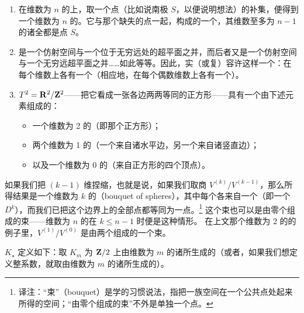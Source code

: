 \begin{example}\label{thm:cellular-decomposition-examples}
\begin{enumerate}[label=(\arabic*)]
\item 在维数为 $n$ 的\trSphere{}上，取一个点（比如说南极 $S$，以便说明想法）的补集，便得到一个维数为 $n$ 的\trOpen{}\trDisk{}。它与那个缺失的点一起，构成\trSphere{}的一个\trCellularDecomposition，其维数至多为 $n-1$ 的诸\trSkeleton{}全都是点 $S$。
\item \trProjectiveSpace{}是一个仿射空间与一个位于无穷远处的超平面之并，而后者又是一个仿射空间与一个无穷远超平面之并……如此等等。因此，实（或复）\trProjectiveSpace{}容许这样一个\trCellularDecomposition：在每个维数上各有一个\trCellular（相应地，在每个偶数维数上各有一个）。
\item \trTorus{} $T^2=\mathbf{R}^2/\mathbf{Z}^2$——把它看成一张各边两两等同的正方形——具有一个由下述元素组成的\trCellularDecomposition：
  \begin{itemize}
  \item 一个维数为 2 的\trCellular（即那个\trOpen{}正方形）；
  \item 两个维数为 1 的\trCellular（一个来自诸水平边，另一个来自诸竖直边）；
  \item 以及一个维数为 0 的\trCellular（来自正方形的四个顶点）。
  \end{itemize}
\end{enumerate}
\end{example}

\begin{remark}\label{thm:skeleton-quotient-bouquet}
如果我们把 $(k-1)$ 维\trSkeleton{}捏缩，也就是说，如果我们取商 $V^{(k)}/V^{(k-1)}$，那么所得结果是一个维数为 $k$ 的\textbf{\trBouquetOfSpheres}（bouquet of spheres），其中每个\trSphere{}各来自一个\trCellular（即一个 $D^k$），而我们已把这个\trCellular{}边界上的全部点都等同为一点。\footnote{译注：“束”（bouquet）是\trTopology{}学的习惯说法，指把一族空间在一个公共点处\trGluing{}起来所得的空间；“由零个\trSphere{}组成的束”不外是单独一个点。}
这个束也可以是由零个\trSphere{}组成的束——维数为 $n$ 的\trSphere{}在 $k\le n-1$ 时便是这种情形。
在上文那个维数为 2 的\trTorus{}的例子里，$V^{(1)}/V^{(0)}$ 是由两个\trCircle{}组成的一个束。
\end{remark}

\trCellular\trComplex{} $K_\star$ 定义如下：取 $K_m$ 为 $\mathbf{Z}/2$ 上由维数为 $m$ 的诸\trCellular{}所生成的\trVectorSpace（或者，如果我们想定义整系数\trHomology，就取由维数为 $m$ 的诸\trCellular{}所生成的\trAbelianGroup）。

